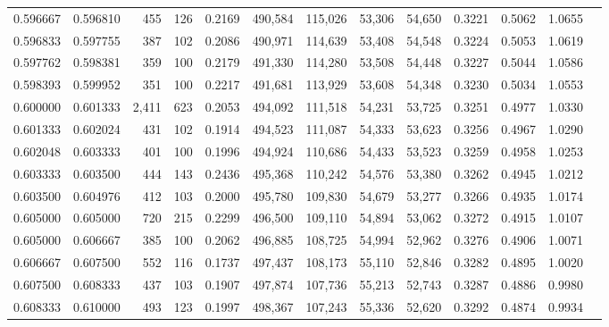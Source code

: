 \begin{tabular}{rrrrrrrrrrrrr}
0.596667 & 0.596810 &   455 & 126 &                                     0.2169 & 490,584 & 115,026 &  53,306 &  54,650 & 0.3221 & 0.5062 & 1.0655 \\
0.596833 & 0.597755 &   387 & 102 &                                     0.2086 & 490,971 & 114,639 &  53,408 &  54,548 & 0.3224 & 0.5053 & 1.0619 \\
0.597762 & 0.598381 &   359 & 100 &                                     0.2179 & 491,330 & 114,280 &  53,508 &  54,448 & 0.3227 & 0.5044 & 1.0586 \\
0.598393 & 0.599952 &   351 & 100 &                                     0.2217 & 491,681 & 113,929 &  53,608 &  54,348 & 0.3230 & 0.5034 & 1.0553 \\
0.600000 & 0.601333 & 2,411 & 623 &                                     0.2053 & 494,092 & 111,518 &  54,231 &  53,725 & 0.3251 & 0.4977 & 1.0330 \\
0.601333 & 0.602024 &   431 & 102 &                                     0.1914 & 494,523 & 111,087 &  54,333 &  53,623 & 0.3256 & 0.4967 & 1.0290 \\
0.602048 & 0.603333 &   401 & 100 &                                     0.1996 & 494,924 & 110,686 &  54,433 &  53,523 & 0.3259 & 0.4958 & 1.0253 \\
0.603333 & 0.603500 &   444 & 143 &                                     0.2436 & 495,368 & 110,242 &  54,576 &  53,380 & 0.3262 & 0.4945 & 1.0212 \\
0.603500 & 0.604976 &   412 & 103 &                                     0.2000 & 495,780 & 109,830 &  54,679 &  53,277 & 0.3266 & 0.4935 & 1.0174 \\
0.605000 & 0.605000 &   720 & 215 &                                     0.2299 & 496,500 & 109,110 &  54,894 &  53,062 & 0.3272 & 0.4915 & 1.0107 \\
0.605000 & 0.606667 &   385 & 100 &                                     0.2062 & 496,885 & 108,725 &  54,994 &  52,962 & 0.3276 & 0.4906 & 1.0071 \\
0.606667 & 0.607500 &   552 & 116 &                                     0.1737 & 497,437 & 108,173 &  55,110 &  52,846 & 0.3282 & 0.4895 & 1.0020 \\
0.607500 & 0.608333 &   437 & 103 &                                     0.1907 & 497,874 & 107,736 &  55,213 &  52,743 & 0.3287 & 0.4886 & 0.9980 \\
0.608333 & 0.610000 &   493 & 123 &                                     0.1997 & 498,367 & 107,243 &  55,336 &  52,620 & 0.3292 & 0.4874 & 0.9934 \\

\end{tabular}
